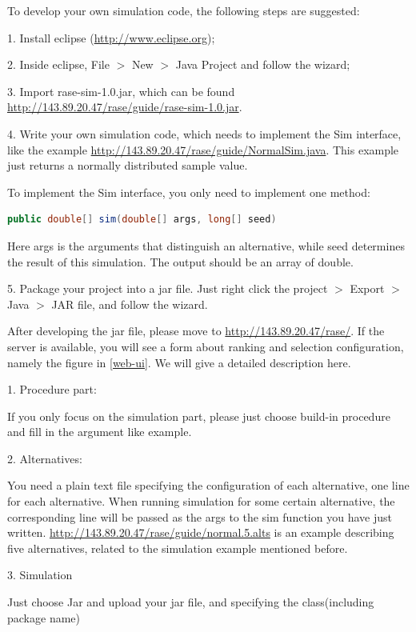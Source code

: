 \documentclass[12pt,a4]{report}
\begin{document}
To develop your own simulation code, the following steps are suggested:

1.	Install eclipse (\url{http://www.eclipse.org});

2.	Inside eclipse, File $>$ New $>$ Java Project and follow the wizard;

3.	Import rase-sim-1.0.jar, which can be found \url{http://143.89.20.47/rase/guide/rase-sim-1.0.jar}.

4.	Write your own simulation code, which needs to implement the Sim interface, like the example \url{http://143.89.20.47/rase/guide/NormalSim.java}. This example just returns a normally distributed sample value.

To implement the Sim interface, you only need to implement one method:

\begin{lstlisting}[language=Java]
public double[] sim(double[] args, long[] seed)
\end{lstlisting}

Here args is the arguments that distinguish an alternative, while seed determines the result of this simulation. The output should be an array of double.

5.	Package your project into a jar file. Just right click the project $>$ Export $>$ Java $>$ JAR file, and follow the wizard.

After developing the jar file, please move to \url{http://143.89.20.47/rase/}. If the server is available, you will see a form about ranking and selection configuration, namely the figure in \ref{web-ui}. We will give a detailed description here.

1.	Procedure part:

If you only focus on the simulation part, please just choose build-in procedure and fill in the argument like example.

2.	Alternatives:

You need a plain text file specifying the configuration of each alternative, one line for each alternative. When running simulation for some certain alternative, the corresponding line will be passed as the args to the sim function you have just written. \url{http://143.89.20.47/rase/guide/normal.5.alts} is an example describing five alternatives, related to the simulation example mentioned before.

3.	Simulation

Just choose Jar and upload your jar file, and specifying the class(including package name)
\end{document}
